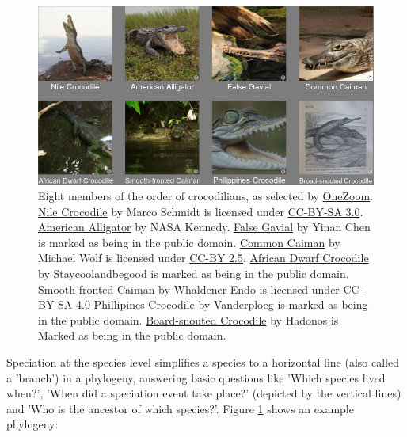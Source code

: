 \begin{figure}[H]
  \includegraphics[width=1.0\textwidth]{crocodilians.png}
  \caption{
    Eight members of the order of crocodilians,
    as selected by \href{https://www.onezoom.org/life.html/@Crocodylia=195672\#x1602,y148,w4.1516}{OneZoom}.
    \href{http://media.eol.org/content/2018/04/11/13/61270_orig.jpg}{Nile Crocodile}
    by Marco Schmidt
    is licensed under \href{http://creativecommons.org/licenses/by-sa/3.0}{CC-BY-SA 3.0}.
    \href{https://www.flickr.com/photos/nasakennedy/14159295507}{American Alligator}
    by NASA Kennedy.
    \href{http://media.eol.org/content/2014/10/06/10/58393_orig.jpg}{False Gavial}
    by Yinan Chen
    is marked as being in the public domain.
    \href{http://media.eol.org/content/2012/06/13/05/87714_orig.jpg}{Common Caiman}
    by Michael Wolf
    is licensed under \href{http://creativecommons.org/licenses/by/2.5}{CC-BY 2.5}.
    \href{http://media.eol.org/content/2013/06/11/03/12146_orig.jpg}{African Dwarf Crocodile}
    by Staycoolandbegood
    is marked as being in the public domain.
    \href{http://media.eol.org/content/2013/11/25/21/58484_orig.jpg}{Smooth-fronted Caiman}
    by Whaldener Endo
    is licensed under \href{http://creativecommons.org/licenses/by-sa/4.0}{CC-BY-SA 4.0}
    \href{http://media.eol.org/content/2013/06/11/03/06619_orig.jpg}{Phillipines Crocodile}
    by Vanderploeg
    is marked as being in the public domain.
    \href{http://media.eol.org/content/2014/10/06/16/93746_orig.jpg}{Board-snouted Crocodile}
    by Hadonos
    is Marked as being in the public domain.
  }
  \label{fig:phylogeny}
\end{figure}



Speciation at the species level simplifies a species to a horizontal 
line (also called a 'branch') in a phylogeny, answering
basic questions like 'Which species lived when?', 'When did a speciation 
event take place?' (depicted by the vertical lines)
and 'Who is the ancestor of which species?'. 
Figure \ref{fig:phylogeny} shows an example phylogeny:

